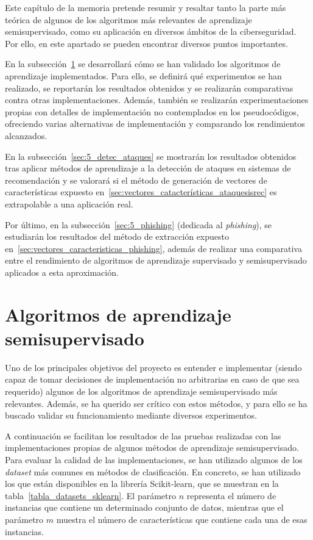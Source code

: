 \label{s:5}

Este capítulo de la memoria pretende resumir y resaltar tanto la parte más teórica de algunos de los algoritmos más relevantes de aprendizaje semisupervisado, como su aplicación en diversos ámbitos de la ciberseguridad. Por ello, en este apartado se pueden encontrar diversos puntos importantes.

En la subsección~\ref{sec:5_ssl} se desarrollará cómo se han validado los algoritmos de aprendizaje implementados. Para ello, se definirá qué experimentos se han realizado, se reportarán los resultados obtenidos y se realizarán comparativas contra otras implementaciones. Además, también se realizarán experimentaciones propias con detalles de implementación no contemplados en los pseudocódigos, ofreciendo varias alternativas de implementación y comparando los rendimientos alcanzados.

En la subsección~\ref{sec:5_detec_ataques} se mostrarán los resultados obtenidos tras aplicar métodos de aprendizaje a la detección de ataques en sistemas de recomendación y se valorará si el método de generación de vectores de características expuesto en~\ref{sec:vectores_catacterísticas_ataquesisrec} es extrapolable a una aplicación real.

Por último, en la subsección~\ref{sec:5_phishing} (dedicada al \textit{phishing}), se estudiarán los resultados del método de extracción expuesto en~\ref{sec:vectores_caracteristicas_phishing}, además de realizar una comparativa entre el rendimiento de algoritmos de aprendizaje supervisado y semisupervisado aplicados a esta aproximación.

\section{Algoritmos de aprendizaje semisupervisado}
\label{sec:5_ssl}

Uno de los principales objetivos del proyecto es entender e implementar (siendo capaz de tomar decisiones de implementación no arbitrarias en caso de que sea requerido) algunos de los algoritmos de aprendizaje semisupervisado más relevantes. Además, se ha querido ser crítico con estos métodos, y para ello se ha buscado validar su funcionamiento mediante diversos experimentos.

A continuación se facilitan los resultados de las pruebas realizadas con las implementaciones propias de algunos métodos de aprendizaje semisupervisado. Para evaluar la calidad de las implementaciones, se han utilizado algunos de los \textit{dataset} más comunes en métodos de clasificación. En concreto, se han utilizado los que están disponibles en la librería Scikit-learn, que se muestran en la tabla~\ref{tabla_datasets_sklearn}. El parámetro $n$ representa el número de instancias que contiene un determinado conjunto de datos, mientras que el parámetro $m$ muestra el número de características que contiene cada una de esas instancias.

